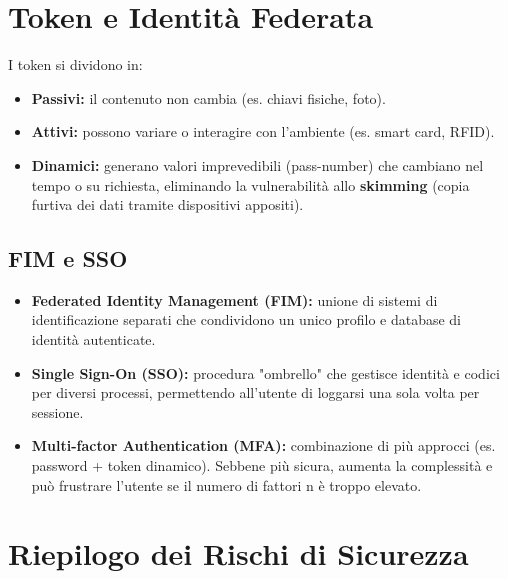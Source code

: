\documentclass{article}
\begin{document}
\vspace{0.8cm}

\section*{Token e Identità Federata}

I token si dividono in:

\begin{itemize}
    \item \textbf{Passivi:} il contenuto non cambia (es. chiavi fisiche, foto).
    \item \textbf{Attivi:} possono variare o interagire con l'ambiente (es. smart card, RFID).
    \item \textbf{Dinamici:} generano valori imprevedibili (pass-number) che cambiano nel tempo o su richiesta, eliminando la vulnerabilità allo \textbf{skimming} (copia furtiva dei dati tramite dispositivi appositi).
\end{itemize}

\subsection*{FIM e SSO}

\begin{itemize}
    \item \textbf{Federated Identity Management (FIM):} unione di sistemi di identificazione separati che condividono un unico profilo e database di identità autenticate.
    \item \textbf{Single Sign-On (SSO):} procedura "ombrello" che gestisce identità e codici per diversi processi, permettendo all'utente di loggarsi una sola volta per sessione.
    \item \textbf{Multi-factor Authentication (MFA):} combinazione di più approcci (es. password + token dinamico). Sebbene più sicura, aumenta la complessità e può frustrare l'utente se il numero di fattori n è troppo elevato.
\end{itemize}

\vspace{0.8cm}

\section*{Riepilogo dei Rischi di Sicurezza}
\end{document}

